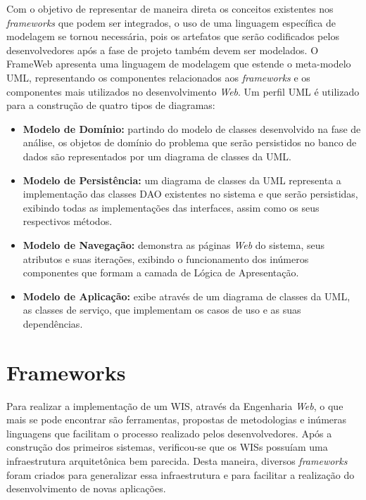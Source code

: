 Com o objetivo de representar de maneira direta os conceitos existentes nos \textit{frameworks} que podem ser integrados, o uso de uma linguagem específica de modelagem se tornou necessária, pois os artefatos que serão codificados pelos desenvolvedores após a fase de projeto também devem ser modelados. O FrameWeb apresenta uma linguagem de modelagem que estende o meta-modelo UML, representando os componentes relacionados aos \textit{frameworks} e os componentes mais utilizados no desenvolvimento \textit{Web}. Um perfil UML é utilizado para a construção de quatro tipos de diagramas: 

\begin{itemize}  

	\item \textbf{Modelo de Domínio:} partindo do modelo de classes desenvolvido na fase de análise, os objetos de domínio do problema que serão persistidos no banco de dados são representados por um diagrama de classes da UML.
	
	\item \textbf{Modelo de Persistência:} um diagrama de classes da UML representa a implementação das classes DAO existentes no sistema e que serão persistidas, exibindo todas as implementações das interfaces, assim como os seus respectivos métodos.   
	
	\item \textbf{Modelo de Navegação:} demonstra as páginas \textit{Web} do sistema, seus atributos e suas iterações, exibindo o funcionamento dos inúmeros componentes que formam a camada de Lógica de Apresentação.
	
	\item \textbf{Modelo de Aplicação:} exibe através de um diagrama de classes da UML, as classes de serviço, que implementam os casos de uso e as suas dependências.

\end{itemize}



\section{Frameworks}
\label{sec-ref-frameworks}

Para realizar a implementação de um WIS, através da Engenharia \textit{Web}, o que mais se pode encontrar são ferramentas, propostas de metodologias e inúmeras linguagens que facilitam o processo realizado pelos desenvolvedores. Após a construção dos primeiros sistemas, verificou-se que os WISs possuíam uma infraestrutura arquitetônica bem parecida. Desta maneira, diversos \textit{frameworks} foram criados para generalizar essa infraestrutura e para facilitar a realização do desenvolvimento de novas aplicações.

